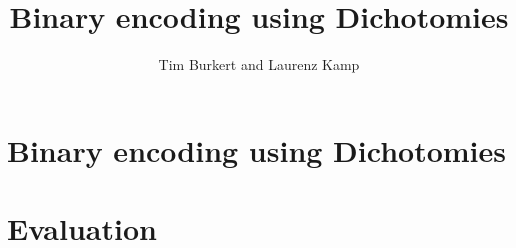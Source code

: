 \documentclass[parskip,11pt,nochapterpage,bigchapter,linedtoc,colorback,accentcolor=tud1d,openany]{tudreport}
\title{Binary encoding using Dichotomies}
\subtitle{Tim Burkert and Laurenz Kamp}
\begin{document}
\maketitle
\tableofcontents

\chapter{Binary encoding using Dichotomies}



\chapter{Evaluation}
\end{document}
